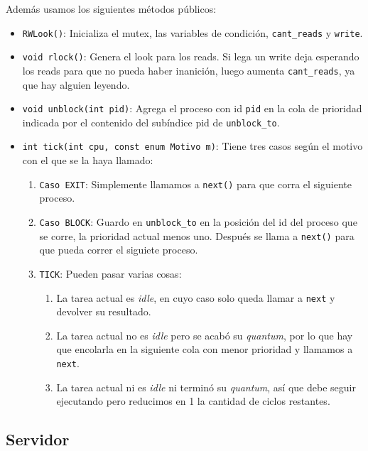 \documentclass[hidelinks,a4paper,12pt, nofootinbib]{article}
\begin{document}
Además usamos los siguientes métodos públicos:
\begin{itemize}
	\item \texttt{RWLook()}: Inicializa el mutex, las variables de condición, \texttt{cant\_reads} y \texttt{write}.
	\item \texttt{void rlock()}: Genera el look para los reads. Si lega un write deja esperando los reads para que no pueda haber inanición, luego aumenta \texttt{cant\_reads}, ya que hay alguien leyendo. 
	\item \texttt{void unblock(int pid)}: Agrega el proceso con id \texttt{pid} en la cola de prioridad indicada por el contenido del subíndice pid de \texttt{unblock\_to}.
	\item \texttt{int tick(int cpu, const enum Motivo m)}: Tiene tres casos según el motivo con el que se la haya llamado:
	\begin{enumerate}
		\item \texttt{Caso EXIT}: Simplemente llamamos a \texttt{next()} para que corra el siguiente proceso.
		\item \texttt{Caso BLOCK}: Guardo en \texttt{unblock\_to} en la posición del id del proceso que se corre, la prioridad actual menos uno. Después se llama a \texttt{next()} para que pueda correr el siguiete proceso.
		\item \texttt{TICK}: Pueden pasar varias cosas:
		\begin{enumerate}
			\item La tarea actual es \emph{idle}, en cuyo caso solo queda llamar a \texttt{next} y devolver su resultado.
			\item La tarea actual no es \emph{idle} pero se acabó su \emph{quantum}, por lo que hay que encolarla en la siguiente cola con menor prioridad y llamamos a \texttt{next}.
			\item La tarea actual ni es \emph{idle} ni terminó su \emph{quantum}, así que debe seguir ejecutando pero reducimos en 1 la cantidad de ciclos restantes.
		\end{enumerate}
	\end{enumerate}
\end{itemize}
\subsection{Servidor}
\end{document}
